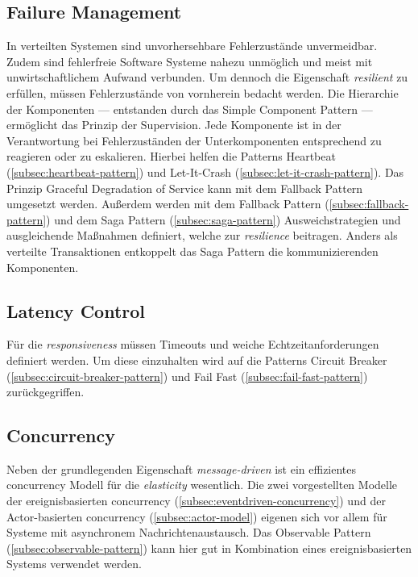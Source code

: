 \subsection{Failure Management}
In verteilten Systemen sind unvorhersehbare Fehlerzustände unvermeidbar. Zudem sind fehlerfreie Software Systeme nahezu unmöglich und meist mit unwirtschaftlichem Aufwand verbunden. Um dennoch die Eigenschaft \textit{resilient} zu erfüllen, müssen Fehlerzustände von vornherein bedacht werden. Die Hierarchie der Komponenten --- entstanden durch das Simple Component Pattern --- ermöglicht das Prinzip der Supervision. Jede Komponente ist in der Verantwortung bei Fehlerzuständen der Unterkomponenten entsprechend zu reagieren oder zu eskalieren. Hierbei helfen die Patterns Heartbeat (\ref{subsec:heartbeat-pattern}) und Let-It-Crash (\ref{subsec:let-it-crash-pattern}). Das Prinzip Graceful Degradation of Service kann mit dem Fallback Pattern umgesetzt werden. Außerdem werden mit dem Fallback Pattern (\ref{subsec:fallback-pattern}) und dem Saga Pattern (\ref{subsec:saga-pattern}) Ausweichstrategien und ausgleichende Maßnahmen definiert, welche zur \textit{resilience} beitragen. Anders als verteilte Transaktionen entkoppelt das Saga Pattern die kommunizierenden Komponenten.

\subsection{Latency Control}
Für die \textit{responsiveness} müssen Timeouts und weiche Echtzeitanforderungen definiert werden. Um diese einzuhalten wird auf die Patterns Circuit Breaker (\ref{subsec:circuit-breaker-pattern}) und Fail Fast (\ref{subsec:fail-fast-pattern}) zurückgegriffen. 

\subsection{Concurrency}
Neben der grundlegenden Eigenschaft \textit{message-driven} ist ein effizientes \gls{concurrency} Modell für die \textit{elasticity} wesentlich. Die zwei vorgestellten Modelle der ereignisbasierten \gls{concurrency} (\ref{subsec:eventdriven-concurrency}) und der Actor-basierten \gls{concurrency} (\ref{subsec:actor-model}) eigenen sich vor allem für Systeme mit asynchronem Nachrichtenaustausch. Das Observable Pattern (\ref{subsec:observable-pattern}) kann hier gut in Kombination eines ereignisbasierten Systems verwendet werden.

\pagebreak

